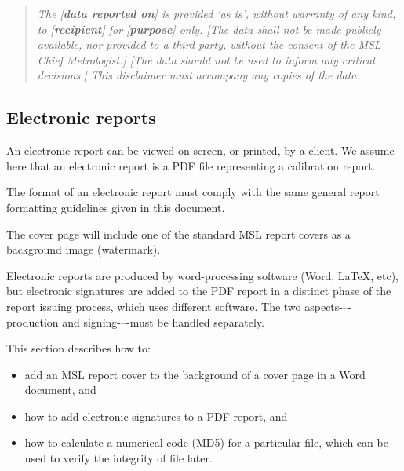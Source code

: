 \begin{quote}
\textit{The [\textbf{data reported on}] is provided `as is', without warranty of any kind, to [\textbf{recipient}] for [\textbf{purpose}] only. [{The data shall not be made publicly available, nor provided to a third party, without the consent of the MSL Chief Metrologist.}] [The data should not be used to inform any critical decisions.] This disclaimer must accompany any copies of the data.}
\end{quote}

\subsection{Electronic reports}
 \label{ss:electronic_reports}
 
An electronic report can be viewed on screen, or printed, by a client. We assume here that an electronic report is a PDF file representing a calibration report. 

The format of an electronic report must comply with the same general report formatting guidelines given in this document. 

The cover page will include one of the standard MSL report covers as a background image (watermark).

Electronic reports are produced by word-processing software (Word, LaTeX, etc), but electronic signatures are added to the PDF report in a distinct phase of the report issuing process, which uses different software. The two aspects-–-production and signing-–-must be handled separately. 
 
This section describes how to: 
\begin{itemize}
\item	add an MSL report cover to the background of a cover page in a Word document, and
\item	how to add electronic signatures to a PDF report, and 
\item	how to calculate a numerical code (MD5) for a particular file, which can be used to verify the integrity of file later.
\end{itemize}

